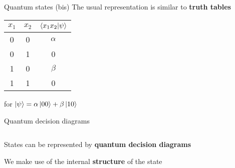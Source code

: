 \begin{frame}{Quantum states (bis)}
    The usual representation is similar to \textbf{truth tables}
    \begin{center}
        \begin{tabular}{c|c|c}
            $x_1$ & $x_2$ & $\braket{x_1 x_2|\psi}$ \\
            \hline
            0 & 0 & $\alpha$ \\
            0 & 1 & 0        \\
            1 & 0 & $\beta$  \\
            1 & 1 & 0
        \end{tabular}

        \vspace{1em}
        \small{for $\ket \psi = \alpha \ket {00} + \beta \ket {10}$}
    \end{center}
\end{frame}

\begin{frame}{Quantum decision diagrams}
    \begin{columns}
        \begin{column}{0.7\textwidth}
            States can be represented by \textbf{quantum decision diagrams}

            \vspace{1em}

            We make use of the internal \textbf{structure} of the state
        \end{column}
        \begin{column}{0.3\textwidth}
        \end{column}
    \end{columns}
\end{frame}


